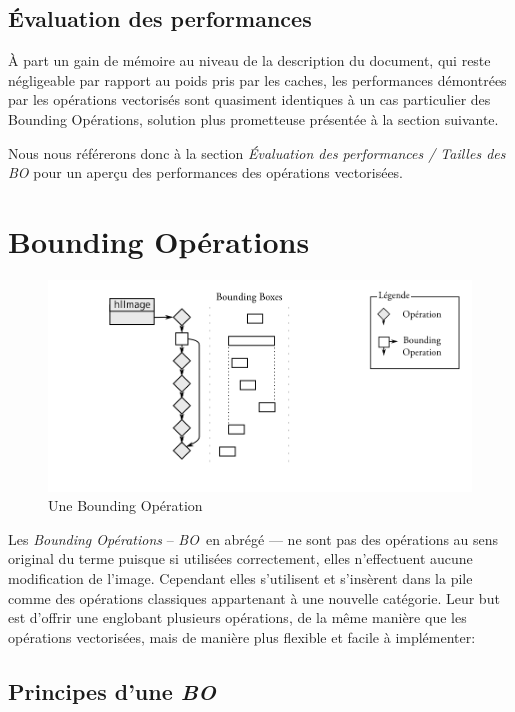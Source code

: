 		\subsection{Évaluation des performances}
		À part un gain de mémoire au niveau de la description du document, qui reste négligeable par rapport au poids pris
		par les caches, les performances démontrées par les opérations vectorisés sont quasiment identiques à un cas particulier
		des Bounding Opérations, solution plus prometteuse présentée à la section suivante.

		Nous nous référerons donc à la section \emph{Évaluation des performances / Tailles des \emph{BO}} 
		pour un aperçu des performances des opérations vectorisées.  

	\section{Bounding Opérations}
\newcommand{\BO}{\emph{BO}~}
		\begin{figure}[ht]
			\centering
			\includegraphics[width=\textwidth]{images/bo} 
			\caption{Une Bounding Opération}
			\label{fig:bo}
		\end{figure}
		Les \emph{Bounding Opérations} -- \BO en abrégé --- ne sont pas des opérations au sens original du terme puisque si utilisées
		correctement, elles n'effectuent aucune modification de l'image. Cependant elles s'utilisent et s'insèrent
		dans la pile comme des opérations classiques  appartenant à une nouvelle catégorie.  Leur but est d'offrir une \BB englobant
		plusieurs opérations, de la même manière que les opérations vectorisées, mais de manière plus flexible et facile à implémenter:

		\subsection{Principes d'une \BO}
		
